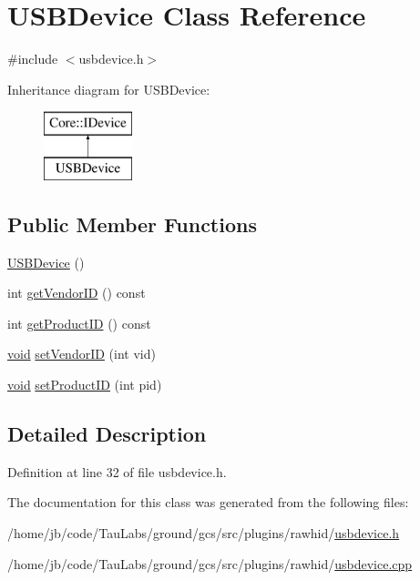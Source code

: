 \hypertarget{class_u_s_b_device}{\section{\-U\-S\-B\-Device \-Class \-Reference}
\label{class_u_s_b_device}
}


{\ttfamily \#include $<$usbdevice.\-h$>$}

\-Inheritance diagram for \-U\-S\-B\-Device\-:\begin{figure}[H]
\begin{center}
\leavevmode
\includegraphics[height=2.000000cm]{class_u_s_b_device}
\end{center}
\end{figure}
\subsection*{\-Public \-Member \-Functions}
\begin{DoxyCompactItemize}
\item 
\hyperlink{group___core_plugin_ga93edec0ee7cca3212ec8553fc8cc51cc}{\-U\-S\-B\-Device} ()
\item 
int \hyperlink{group___core_plugin_ga292a0c79309ca19602eb3a3538ae23b2}{get\-Vendor\-I\-D} () const 
\item 
int \hyperlink{group___core_plugin_ga82accd0aa6340a4f0b62112a4d4167f6}{get\-Product\-I\-D} () const 
\item 
\hyperlink{group___u_a_v_objects_plugin_ga444cf2ff3f0ecbe028adce838d373f5c}{void} \hyperlink{group___core_plugin_ga2380f14d6b9cdc20421d32b660881955}{set\-Vendor\-I\-D} (int vid)
\item 
\hyperlink{group___u_a_v_objects_plugin_ga444cf2ff3f0ecbe028adce838d373f5c}{void} \hyperlink{group___core_plugin_ga62cc5d3c3c0fe1d81d61ce2f7d5c24be}{set\-Product\-I\-D} (int pid)
\end{DoxyCompactItemize}


\subsection{\-Detailed \-Description}


\-Definition at line 32 of file usbdevice.\-h.



\-The documentation for this class was generated from the following files\-:\begin{DoxyCompactItemize}
\item 
/home/jb/code/\-Tau\-Labs/ground/gcs/src/plugins/rawhid/\hyperlink{usbdevice_8h}{usbdevice.\-h}\item 
/home/jb/code/\-Tau\-Labs/ground/gcs/src/plugins/rawhid/\hyperlink{usbdevice_8cpp}{usbdevice.\-cpp}\end{DoxyCompactItemize}
